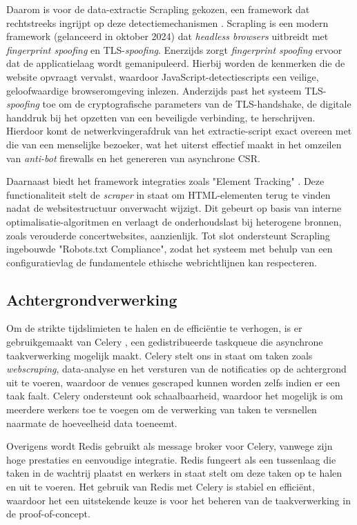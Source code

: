 Daarom is voor de data-extractie Scrapling gekozen, een framework dat rechtstreeks ingrijpt op deze detectiemechanismen \autocite{Scrapling}. 
Scrapling is een modern framework (gelanceerd in oktober 2024) dat \textit{headless browsers} uitbreidt met \textit{fingerprint spoofing} en TLS-\textit{spoofing}. 
Enerzijds zorgt \textit{fingerprint spoofing} ervoor dat de applicatielaag wordt gemanipuleerd. Hierbij worden de kenmerken die de website opvraagt vervalst, waardoor JavaScript-detectiescripts een veilige, geloofwaardige browseromgeving inlezen. 
Anderzijds past het systeem TLS-\textit{spoofing} toe om de cryptografische parameters van de TLS-handshake, de digitale handdruk bij het opzetten van een beveiligde verbinding, te herschrijven. 
Hierdoor komt de netwerkvingerafdruk van het extractie-script exact overeen met die van een menselijke bezoeker, wat het uiterst effectief maakt in het omzeilen van \textit{anti-bot} firewalls en het genereren van asynchrone \gls{CSR}.

Daarnaast biedt het framework integraties zoals "Element Tracking"  \autocite{Scrapling}. Deze functionaliteit stelt de \textit{scraper} in staat om HTML-elementen terug te vinden nadat de websitestructuur onverwacht wijzigt. 
Dit gebeurt op basis van interne optimalisatie-algoritmen en verlaagt de onderhoudslast bij heterogene bronnen, zoals verouderde concertwebsites, aanzienlijk. 
Tot slot ondersteunt Scrapling ingebouwde "Robots.txt Compliance", zodat het systeem met behulp van een configuratievlag de fundamentele ethische webrichtlijnen kan respecteren.

\subsection{Achtergrondverwerking}

Om de strikte tijdslimieten te halen en de efficiëntie te verhogen, is er gebruikgemaakt van Celery \autocite{Celery}, een gedistribueerde taskqueue die asynchrone taakverwerking mogelijk maakt. 
Celery stelt ons in staat om taken zoals \textit{webscraping}, data-analyse en het versturen van de notificaties op de achtergrond uit te voeren, waardoor de venues gescraped kunnen worden zelfs indien er een taak faalt. 
Celery ondersteunt ook schaalbaarheid, waardoor het mogelijk is om meerdere werkers toe te voegen om de verwerking van taken te versnellen naarmate de hoeveelheid data toeneemt.

Overigens wordt Redis \autocite{Redis} gebruikt als message broker voor Celery, vanwege zijn hoge prestaties en eenvoudige integratie. 
Redis fungeert als een tussenlaag die taken in de wachtrij plaatst en werkers in staat stelt om deze taken op te halen en uit te voeren. 
Het gebruik van Redis met Celery is stabiel en efficiënt, waardoor het een uitstekende keuze is voor het beheren van de taakverwerking in de proof-of-concept.

